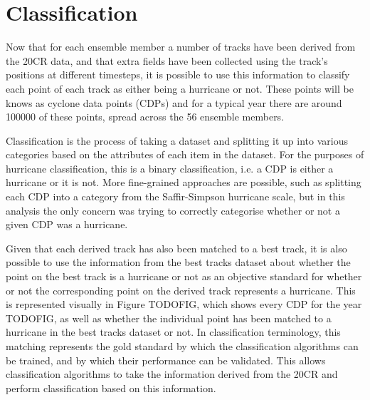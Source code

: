 \documentclass[pdftex,12pt,a4paper]{report}
\begin{document}



\section{Classification}


Now that for each ensemble member a number of tracks have been derived from the 20CR data, and that
extra fields have been collected using the track's positions at different timesteps, it is possible
to use this information to classify each point of each track as either being a hurricane or not.
These points will be knows as cyclone data points (CDPs) and for a typical year there are around
100000 of these points, spread across the 56 ensemble members.

Classification is the process of taking a dataset and splitting it up into various categories based
on the attributes of each item in the dataset. For the purposes of hurricane classification, this is
a binary classification, i.e. a CDP is either a hurricane or it is not. More fine-grained approaches
are possible, such as splitting each CDP into a category from the Saffir-Simpson hurricane scale,
but in this analysis the only concern was trying to correctly categorise whether or not a given CDP
was a hurricane.

Given that each derived track has also been matched to a best track, it is also possible to use the
information from the best tracks dataset about whether the point on the best track is a hurricane or
not as an objective standard for whether or not the corresponding point on the derived track
represents a hurricane. This is represented visually in Figure TODOFIG, which shows every CDP for the
year TODOFIG, as well as whether the individual point has been matched to a hurricane in the best
tracks dataset or not. In classification terminology, this matching represents the gold standard by
which the classification algorithms can be trained, and by which their performance can be validated.
This allows classification algorithms to take the information derived from the 20CR and perform
classification based on this information.
\end{document}

